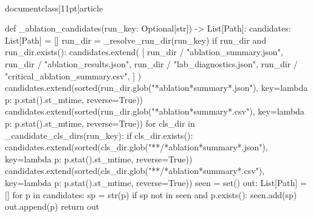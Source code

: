 \\documentclass[11pt]{article}
\begin{document}
\begin{CodeBlock}
{def _ablation_candidates(run_key: Optional[str]) -> List[Path]:
    candidates: List[Path] = []
    run_dir = _resolve_run_dir(run_key)
    if run_dir and run_dir.exists():
        candidates.extend(
            [
                run_dir / "ablation_summary.json",
                run_dir / "ablation_results.json",
                run_dir / "lab_diagnostics.json",
                run_dir / "critical_ablation_summary.csv",
            ]
        )
        candidates.extend(sorted(run_dir.glob("*ablation*summary*.json"), key=lambda p: p.stat().st_mtime, reverse=True))
        candidates.extend(sorted(run_dir.glob("*ablation*summary*.csv"), key=lambda p: p.stat().st_mtime, reverse=True))
        for cls_dir in _candidate_cls_dirs(run_key):
            if cls_dir.exists():
                candidates.extend(sorted(cls_dir.glob("**/*ablation*summary*.json"), key=lambda p: p.stat().st_mtime, reverse=True))
                candidates.extend(sorted(cls_dir.glob("**/*ablation*summary*.csv"), key=lambda p: p.stat().st_mtime, reverse=True))
    seen = set()
    out: List[Path] = []
    for p in candidates:
        sp = str(p)
        if sp not in seen and p.exists():
            seen.add(sp)
            out.append(p)
    return out


}
\end{CodeBlock}
\end{document}
